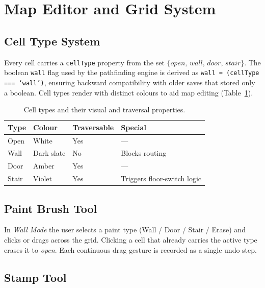 \documentclass[12pt,a4paper]{article}
\begin{document}
\section{Map Editor and Grid System}
\label{sec:editor}

\subsection{Cell Type System}

Every cell carries a \texttt{cellType} property from the set
$\{\textit{open},\,\textit{wall},\,\textit{door},\,\textit{stair}\}$.
The boolean \texttt{wall} flag used by the pathfinding engine is derived as
\texttt{wall = (cellType === `wall')}, ensuring backward compatibility with
older saves that stored only a boolean. Cell types render with distinct colours
to aid map editing (Table~\ref{tab:celltypes}).

\begin{table}[H]
\centering
\caption{Cell types and their visual and traversal properties.}
\label{tab:celltypes}
\small
\begin{tabular}{@{}llll@{}}
\toprule
\textbf{Type} & \textbf{Colour} & \textbf{Traversable} & \textbf{Special} \\
\midrule
Open  & White              & Yes & --- \\
Wall  & Dark slate         & No  & Blocks routing \\
Door  & Amber              & Yes & --- \\
Stair & Violet             & Yes & Triggers floor-switch logic \\
\bottomrule
\end{tabular}
\end{table}

\subsection{Paint Brush Tool}

In \emph{Wall Mode} the user selects a paint type (Wall / Door / Stair / Erase)
and clicks or drags across the grid. Clicking a cell that already carries the
active type erases it to \emph{open}. Each continuous drag gesture is
recorded as a single undo step.

\subsection{Stamp Tool}
\end{document}
